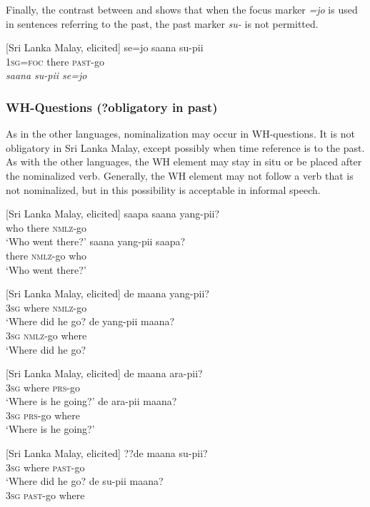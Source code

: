 Finally, the contrast between  and  shows that when the focus marker \textit{=jo }is used in sentences referring to the past, the past marker \textit{su- } is not permitted.

\ea\label{smith:ex:77}
{}[Sri Lanka Malay, elicited]
\ea
\gll *se=jo saana su-pii \\
1\textsc{sg}=\textsc{foc} there \textsc{past}-go\\
\ex
\em *saana su-pii se=jo \em
\z
\z


\subsubsection{WH-Questions (?obligatory in past)}%
As in the other languages, nominalization may occur in WH-questions. It is not obligatory in Sri Lanka Malay, except possibly when time reference is to the past. As with the other languages, the WH element may stay in situ or be placed after the nominalized verb. Generally, the WH element may not follow a verb that is not nominalized, but in  this possibility is acceptable in informal speech. 

\ea\label{smith:ex:78}
{}[Sri Lanka Malay, elicited]
\ea
\gll saapa saana yang-pii?   \\
who there \textsc{nmlz}-go              \\
`Who went there?'
\ex
\gll  saana yang-pii saapa? \\
       there \textsc{nmlz}-go who\\
`Who went there?'
\z
\z

\ea\label{smith:ex:79}
{}[Sri Lanka Malay, elicited]
\ea
\gll de maana yang-pii?   \\
3\textsc{sg} where \textsc{nmlz}-go           \\
`Where did he go?
\ex
\gll  de yang-pii maana? \\
        3\textsc{sg} \textsc{nmlz}-go where\\
`Where did he go?
\z
\z

\ea\label{smith:ex:80}
\ea
{}[Sri Lanka Malay, elicited]
\gll de maana ara-pii?        \\
3\textsc{sg} where \textsc{prs}-go                \\
`Where is he going?'
\ex
\gll  de ara-pii maana? \\
      3\textsc{sg} \textsc{prs}-go where\\
`Where is he going?'
\z
\z

\ea\label{smith:ex:81}
{}[Sri Lanka Malay, elicited]
\ea
\gll ??de maana su-pii?                \\
 3\textsc{sg} where \textsc{past}-go  \\
`Where did he go? 
\ex
\gll *de su-pii maana? \\
     3\textsc{sg} \textsc{past}-go where\\
\z
\z

